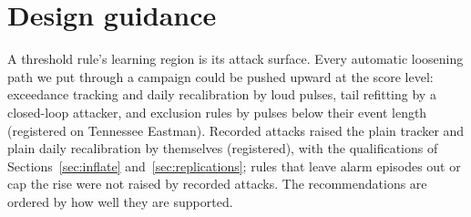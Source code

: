\documentclass[sigconf,review,anonymous]{acmart}
\begin{document}
\section{Design guidance}
\label{sec:design}

A threshold rule's learning region is its attack surface. Every automatic loosening path we put through
a campaign could be pushed upward at the score level: exceedance tracking and daily recalibration by
loud pulses, tail refitting by a closed-loop attacker, and exclusion rules by pulses below their event
length (registered on Tennessee Eastman). Recorded attacks raised the plain tracker and plain daily
recalibration by themselves (registered), with the qualifications of Sections~\ref{sec:inflate}
and~\ref{sec:replications}; rules that leave alarm episodes out or cap the rise were not raised by
recorded attacks. The recommendations are ordered by how well they are supported.
\end{document}
